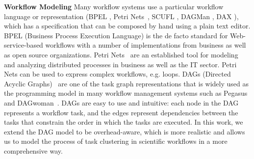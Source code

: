 \textbf{Workflow Modeling} Many workflow systems use a particular workflow language or representation (BPEL \cite{BPEL}, Petri Nets~\cite{alt2006grid}, SCUFL \cite{Oinn2004}, DAGMan \cite{Kalayci2010}, DAX \cite{Deelman2005}), which has a specification that can be composed by hand using a plain text editor. BPEL (Business Process Execution Language) \cite{BPEL} is the de facto standard for Web-service-based workflows with a number of implementations from business as well as open source organizations. Petri Nets~\cite{alt2006grid} are an established tool for modeling and analyzing distributed processes in business as well as the IT sector. Petri Nets can be used to express complex workflows, e.g. loops. 
DAGs (Directed Acyclic Graphs)~\cite{Deelman2005} are one of the task graph representations that is widely used as the programming model in many workflow management systems such as Pegasus~\cite{Deelman2004} and DAGwoman~\cite{Tschager2012DAGwoman}. DAGs are easy to use and intuitive: each node in the DAG represents a workflow task, and the edges represent dependencies between the tasks that constrain the order in which the tasks are executed. 
In this work, we extend the DAG model to be overhead-aware, which is more realistic and allows us to model the process of task clustering in scientific workflows in a more comprehensive way. 




